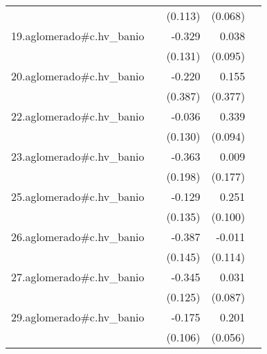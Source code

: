 {\begin{longtable}{l*{4}{D{.}{.}{-1}}}
            &                     &     (0.113)         &     (0.068)         &                     \\
\addlinespace
19.aglomerado#c.hv\_banio&                     &      -0.329\sym{*}  &       0.038         &                     \\
            &                     &     (0.131)         &     (0.095)         &                     \\
\addlinespace
20.aglomerado#c.hv\_banio&                     &      -0.220         &       0.155         &                     \\
            &                     &     (0.387)         &     (0.377)         &                     \\
\addlinespace
22.aglomerado#c.hv\_banio&                     &      -0.036         &       0.339\sym{***}&                     \\
            &                     &     (0.130)         &     (0.094)         &                     \\
\addlinespace
23.aglomerado#c.hv\_banio&                     &      -0.363         &       0.009         &                     \\
            &                     &     (0.198)         &     (0.177)         &                     \\
\addlinespace
25.aglomerado#c.hv\_banio&                     &      -0.129         &       0.251\sym{*}  &                     \\
            &                     &     (0.135)         &     (0.100)         &                     \\
\addlinespace
26.aglomerado#c.hv\_banio&                     &      -0.387\sym{**} &      -0.011         &                     \\
            &                     &     (0.145)         &     (0.114)         &                     \\
\addlinespace
27.aglomerado#c.hv\_banio&                     &      -0.345\sym{**} &       0.031         &                     \\
            &                     &     (0.125)         &     (0.087)         &                     \\
\addlinespace
29.aglomerado#c.hv\_banio&                     &      -0.175         &       0.201\sym{***}&                     \\
            &                     &     (0.106)         &     (0.056)         &                     \\

\end{longtable}}
